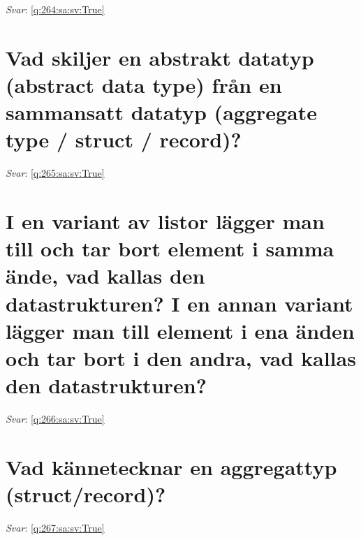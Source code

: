\documentclass[a4paper,11pt,oneside]{book}
\begin{document}
\begin{sloppypar}
\vspace{1cm}

\textit{Svar}: \autoref{q:264:sa:sv:True}



\section{Vad skiljer en abstrakt datatyp (abstract data type) fr\r{a}n en sammansatt datatyp (aggregate type / struct / record)?}

\label{q:265:sa:sv:False}

\vspace{2cm}

\noindent\makebox[\textwidth]{\hrulefill}

\vspace{1cm}

\textit{Svar}: \autoref{q:265:sa:sv:True}



\section{I en variant av listor l\"agger man till och tar bort element i samma \"ande, vad kallas den datastrukturen? I en annan variant l\"agger man till element i ena \"anden och tar bort i den andra, vad kallas den datastrukturen?}

\label{q:266:sa:sv:False}

\vspace{2cm}

\noindent\makebox[\textwidth]{\hrulefill}

\vspace{1cm}

\textit{Svar}: \autoref{q:266:sa:sv:True}



\section{Vad k\"annetecknar en aggregattyp (struct/record)?}

\label{q:267:sa:sv:False}

\vspace{2cm}

\noindent\makebox[\textwidth]{\hrulefill}

\vspace{1cm}

\textit{Svar}: \autoref{q:267:sa:sv:True}




\end{sloppypar}
\end{document}
